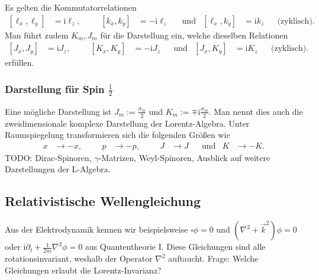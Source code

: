 \documentclass[english, parskip=full]{scrreport}
\newcommand{\klam}{}
\newcommand{\tecxt}{}
\renewcommand{\i}{\text{i}}
\begin{document}
Es gelten die Kommutatorrelationen
\begin{align}
\klam\left[ \ell_x, \ell_y \right] &= \i\ell_z , &&& \klam\left[ k_x,k_y \right] &= -\i\ell_z &&\tecxt\text{und} & \klam\left[ \ell_x, k_y \right] &= \i k_z &&\tecxt\text{(zyklisch)} .
\end{align}
Man führt zudem $K_m, J_m$ für die Darstellung ein, welche dieselben Relationen 
\begin{align}
\klam\left[ J_x, J_y \right] &= \i J_z , &&& \klam\left[ K_x, K_y \right] &= -\i J_z &&\tecxt\text{und} & \klam\left[ J_x, K_y \right] &= \i K_z &&\tecxt\text{(zyklisch)} .
\end{align}
erfüllen.

\subsubsection{Darstellung für Spin $\frac{1}{2}$}
Eine mögliche Darstellung ist $J_m := \frac{\sigma_m}{2}$ und $K_m := \mp\i\frac{\sigma_m}{2}$.
Man nennt dies auch die zweidimensionale komplexe Darstellung der Lorentz-Algebra.
Unter Raumspiegelung transformieren sich die folgenden Größen wie
\begin{align}
x&\rightarrow -x, &&& p&\rightarrow -p, &&& J&\rightarrow J && \tecxt\text{und} & K&\rightarrow -K.
\end{align}
TODO: Dirac-Spinoren, $\gamma$-Matrizen, Weyl-Spinoren, Ausblick auf weitere Darstellungen der L-Algebra.

\subsection{Relativistische Wellengleichung}
Aus der Elektrodynamik kennen wir beispielsweise $\square\phi = 0$ und $(\nabla^2 + \vec{k}^2)\phi = 0$ oder $\i\partial_t + \frac{1}{2m}\nabla^2\phi = 0$ aus Quantentheorie I.
Diese Gleichungen sind alle rotationsinvariant, weshalb der Operator $\nabla^2$ auftaucht.
Frage: Welche Gleichungen erlaubt die Lorentz-Invarianz?
\\
\end{document}
